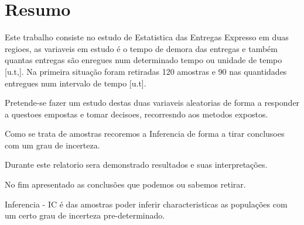 
%

%
\tableofcontents
%
\appendix
%
\pagestyle{plain}%
\newpage
\section{Resumo}\label{Resumo}


Este trabalho consiste no estudo de Estatistica das Entregas Expresso em  duas regioes, as variaveis em estudo é o tempo de demora das entregas e também quantas entregas são enregues num determinado tempo ou unidade de tempo [u.t,]. Na primeira situação foram retiradas 120 amostras e 90 nas quantidades entregues num intervalo de tempo [u.t].

Pretende-se fazer um estudo destas duas variaveis aleatorias de forma a responder a questoes empostas e tomar decisoes, recorresndo aos metodos expostos.

Como se trata de amostras recoremos a Inferencia de forma a tirar conclusoes com um grau de incerteza.

Durante este relatorio sera demonstrado resultados e suas interpretações.

No fim apresentado as conclusões que podemos ou sabemos retirar.





Inferencia - IC é das amostras poder inferir characteristicas as populações com um certo grau de incerteza pre-determinado.


\newpage
%
